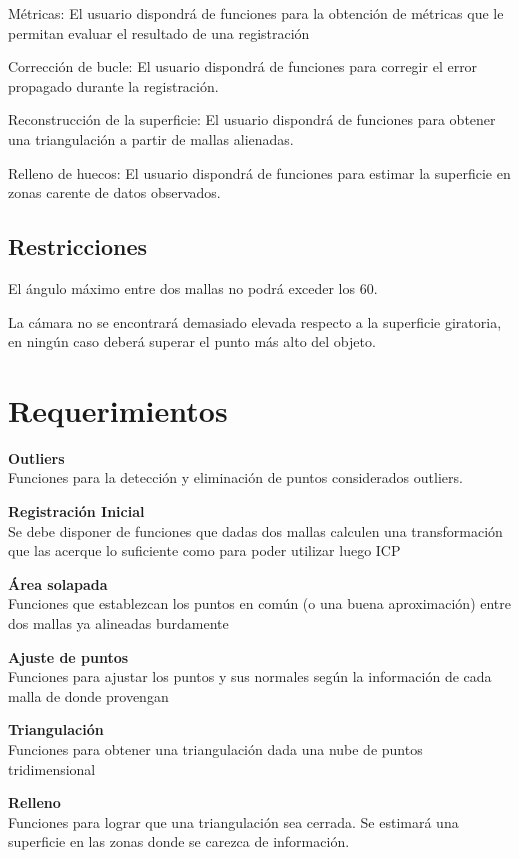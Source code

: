 \documentclass{pfc}
\newcommand{\Requerimiento}[2]{
	{\bfseries #1}\\
	#2
}
\begin{document}
			Métricas:
				El usuario dispondrá de funciones para
				la obtención de métricas que le permitan
				evaluar el resultado de una registración

			Corrección de bucle:
				El usuario dispondrá de funciones para
				corregir el error propagado durante la registración.

			Reconstrucción de la superficie:
				El usuario dispondrá de funciones para 
				obtener una triangulación a partir de mallas alienadas.

			Relleno de huecos:
				El usuario dispondrá de funciones para 
				estimar la superficie en zonas carente de datos observados.

		\subsection{Restricciones}
			El ángulo máximo entre dos mallas no podrá exceder los 60\textdegree.

			La cámara no se encontrará demasiado elevada respecto a la
			superficie giratoria, en ningún caso deberá superar el punto más alto del objeto.

	\section{Requerimientos}
		\Requerimiento
			{Outliers}
			{Funciones para la detección y eliminación de puntos considerados
			outliers.}

		\Requerimiento
			{Registración Inicial}
			{Se debe disponer de funciones que dadas dos mallas calculen una
			transformación que las acerque lo suficiente como para poder
			utilizar luego ICP}

		\Requerimiento
			{Área solapada}
			{Funciones que establezcan los puntos en común (o una buena
			aproximación) entre dos mallas ya alineadas burdamente}

		\Requerimiento
			{Ajuste de puntos}
			{Funciones para ajustar los puntos y sus normales según la
			información de cada malla de donde provengan}

		\Requerimiento
			{Triangulación}
			{Funciones para obtener una triangulación dada una nube de puntos tridimensional}

		\Requerimiento
			{Relleno}
			{Funciones para lograr que una triangulación sea cerrada. Se
			estimará una superficie en las zonas donde se carezca de
			información.}
\end{document}
